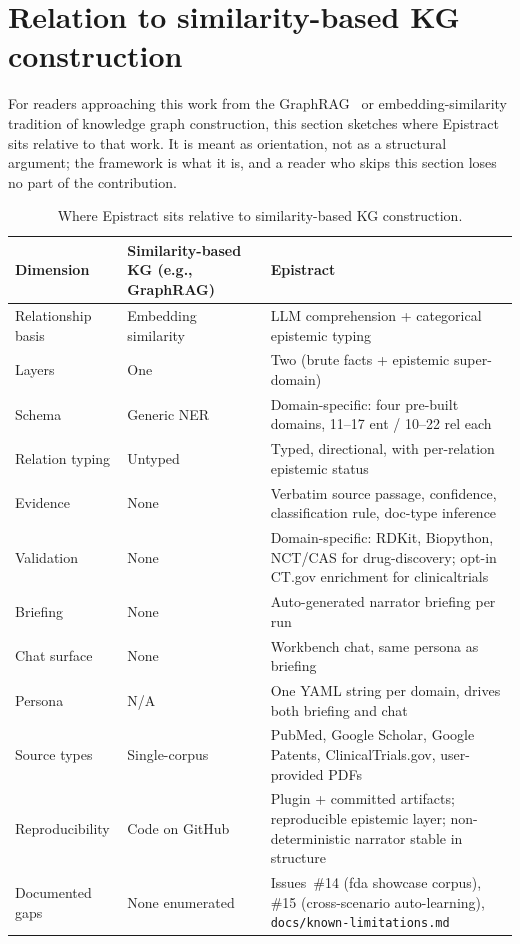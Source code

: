 \section{Relation to similarity-based KG construction}
\label{sec:evolution}

For readers approaching this work from the GraphRAG~\cite{edge2024graphrag} or embedding-similarity tradition of knowledge graph construction, this section sketches where Epistract sits relative to that work. It is meant as orientation, not as a structural argument; the framework is what it is, and a reader who skips this section loses no part of the contribution.

\begin{table}[t]
\centering
\caption{Where Epistract sits relative to similarity-based KG construction.}
\label{tab:evolution-three}
\small
\begin{tabular}{@{}lp{3.5cm}p{6.0cm}@{}}
\toprule
\textbf{Dimension} & \textbf{Similarity-based KG (e.g., GraphRAG)} & \textbf{Epistract} \\
\midrule
Relationship basis   & Embedding similarity                & LLM comprehension + categorical epistemic typing \\
Layers               & One                                 & Two (brute facts + epistemic super-domain) \\
Schema               & Generic NER                         & Domain-specific: four pre-built domains, 11--17 ent / 10--22 rel each \\
Relation typing      & Untyped                             & Typed, directional, with per-relation epistemic status \\
Evidence             & None                                & Verbatim source passage, confidence, classification rule, doc-type inference \\
Validation           & None                                & Domain-specific: RDKit, Biopython, NCT/CAS for drug-discovery; opt-in CT.gov enrichment for clinicaltrials \\
Briefing             & None                                & Auto-generated narrator briefing per run \\
Chat surface         & None                                & Workbench chat, same persona as briefing \\
Persona              & N/A                                 & One YAML string per domain, drives both briefing and chat \\
Source types         & Single-corpus                       & PubMed, Google Scholar, Google Patents, ClinicalTrials.gov, user-provided PDFs \\
Reproducibility      & Code on GitHub                      & Plugin + committed artifacts; reproducible epistemic layer; non-deterministic narrator stable in structure \\
Documented gaps      & None enumerated                     & Issues~\#14 (fda showcase corpus), \#15 (cross-scenario auto-learning), \texttt{docs/known-limitations.md} \\
\bottomrule
\end{tabular}
\end{table}

